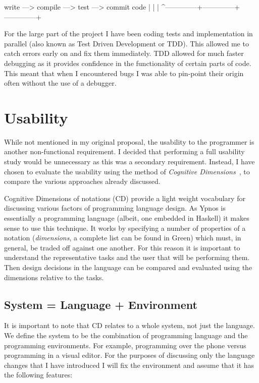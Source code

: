 \documentclass[12pt,a4paper,oneside]{scrbook}
\begin{document}
\begin{hflisting}[caption={The write, compile, test, commit cycle used throughout
  development of this project}.]
write  --->  compile   --->   test   --->   commit
code             |              |              |
  ^--------------+--------------+--------------+
\end{hflisting}

For the large part of the project I have been coding tests and
implementation in parallel (also known as Test Driven Development or
TDD). This allowed me to catch errors early on and fix them immediately.
TDD allowed for much faster debugging as it provides confidence in the
functionality of certain parts of code. This meant that when I
encountered bugs I was able to pin-point their origin often without the
use of a debugger.

\section{Usability}

While not mentioned in my original proposal, the usability to the programmer is
another non-functional requirement. I decided that performing a full usability
study would be unnecessary as this was a secondary requirement. Instead, I have
chosen to evaluate the usability using the method of \emph{Cognitive
  Dimensions}~\cite{green96}, to compare the various approaches already
discussed.

Cognitive Dimensions of notations (CD) provide a light weight vocabulary for
discussing various factors of programming language design. As Ypnos is
essentially a programming language (albeit, one embedded in Haskell) it makes
sense to use this technique. It works by specifying a number of properties of a
notation (\emph{dimensions}, a complete list can be found in
Green\cite{green96}) which must, in general, be traded off against one
another. For this reason it is important to understand the representative tasks
and the user that will be performing them. Then design decisions in the language
can be compared and evaluated using the dimensions relative to the tasks.

\subsection{System = Language + Environment}

It is important to note that CD relates to a whole system, not just the
language. We define the system to be the combination of programming language and
the programming environments. For example, programming over the phone versus
programming in a visual editor. For the purposes of discussing only the language
changes that I have introduced I will fix the environment and assume that it has
the following features:
\end{document}

